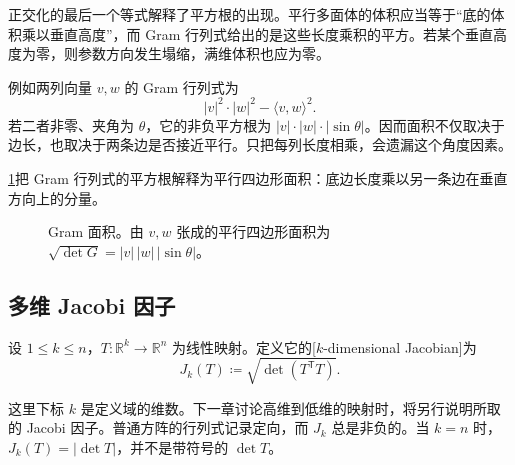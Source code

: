 正交化的最后一个等式解释了平方根的出现。平行多面体的体积应当等于“底的体积乘以垂直高度”，而 Gram 行列式给出的是这些长度乘积的平方。若某个垂直高度为零，则参数方向发生塌缩，满维体积也应为零。

\ProseParagraphBreak

例如两列向量 \(v,w\) 的 Gram 行列式为
\[
 |v|^2\cdot|w|^2-\langle v,w\rangle^2.
\]
若二者非零、夹角为 \(\theta\)，它的非负平方根为 \(|v|\cdot|w|\cdot|\sin\theta|\)。因而面积不仅取决于边长，也取决于两条边是否接近平行。只把每列长度相乘，会遗漏这个角度因素。

\ProseParagraphBreak

\cref{b1:fig:gram-parallelogram}把 Gram 行列式的平方根解释为平行四边形面积：底边长度乘以另一条边在垂直方向上的分量。
\begin{figure}[htbp]
  \centering
  \caption[Gram 面积]{Gram 面积。由 \(v,w\) 张成的平行四边形面积为 \(\sqrt{\det G}=|v|\,|w|\,|\sin\theta|\)。}
  \label{b1:fig:gram-parallelogram}
\end{figure}

\subsection{多维 Jacobi 因子}
\label{b1:subsec:170102}

\begin{definition}\label{b1:def:linear-jacobian}
设 \(1\leq k\leq n\)，\(T:\mathbb R^k\to\mathbb R^n\) 为线性映射。定义它的[\(k\)-dimensional Jacobian]为
\[
 J_k(T)\coloneqq\sqrt{\det(T^{\mathsf T}T)}.
\]
\end{definition}

这里下标 \(k\) 是定义域的维数。下一章讨论高维到低维的映射时，将另行说明所取的 Jacobi 因子。普通方阵的行列式记录定向，而 \(J_k\) 总是非负的。当 \(k=n\) 时，\(J_k(T)=|\det T|\)，并不是带符号的 \(\det T\)。

